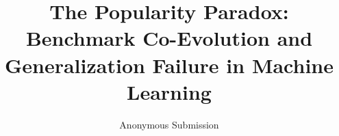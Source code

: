 \title{The Popularity Paradox: Benchmark Co-Evolution and Generalization Failure in Machine Learning}

\author{Anonymous Submission}

\maketitle
